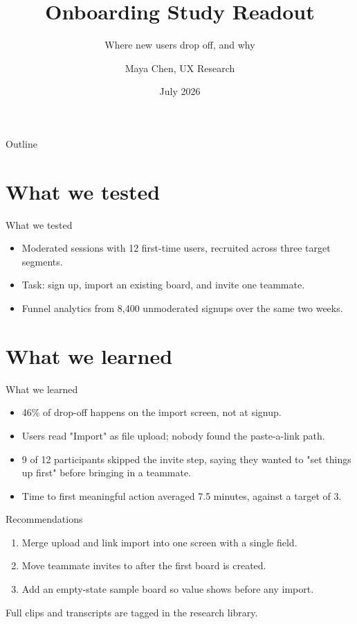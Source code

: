 \documentclass[aspectratio=169]{beamer}
\title{Onboarding Study Readout}
\subtitle{Where new users drop off, and why}
\author{Maya Chen, UX Research}
\institute{Driftboard Design Team}
\date{July 2026}
\begin{document}
\begin{frame}
  \titlepage
\end{frame}

\begin{frame}{Outline}
  \tableofcontents
\end{frame}

\section{What we tested}

\begin{frame}{What we tested}
  \begin{itemize}
    \item Moderated sessions with 12 first-time users, recruited across three
          target segments.
    \item Task: sign up, import an existing board, and invite one teammate.
    \item Funnel analytics from 8,400 unmoderated signups over the same two weeks.
  \end{itemize}
\end{frame}

\section{What we learned}

\begin{frame}{What we learned}
  \begin{itemize}
    \item 46\% of drop-off happens on the import screen, not at signup.
    \item Users read "Import" as file upload; nobody found the paste-a-link path.
    \item 9 of 12 participants skipped the invite step, saying they wanted to
          "set things up first" before bringing in a teammate.
    \item Time to first meaningful action averaged 7.5 minutes, against a
          target of 3.
  \end{itemize}
\end{frame}

\begin{frame}{Recommendations}
  \begin{enumerate}
    \item Merge upload and link import into one screen with a single field.
    \item Move teammate invites to after the first board is created.
    \item Add an empty-state sample board so value shows before any import.
  \end{enumerate}
  \vspace{1em}
  Full clips and transcripts are tagged in the research library.
\end{frame}
\end{document}
